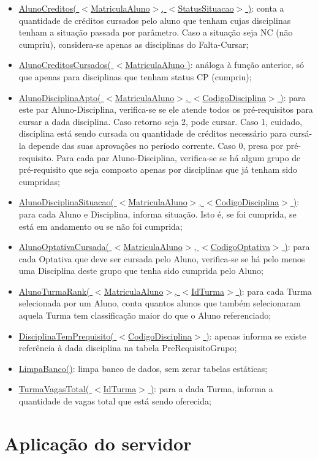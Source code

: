 \documentclass[graduacao,brazil]{ThesisPUC}
\begin{document}
\begin{itemize}
	\item \underline{AlunoCreditos( $<$MatriculaAluno$>$, $<$StatusSituacao$>$ )}: conta a quantidade de créditos cursados pelo aluno que tenham  cujas disciplinas tenham a situação passada por parâmetro. Caso a situação seja NC (não cumpriu), considera-se apenas as disciplinas do Falta-Cursar;
	\item \underline{AlunoCreditosCursados( $<$MatriculaAluno )}: análoga à função anterior, só que apenas para disciplinas que tenham status CP (cumpriu);
	\item \underline{AlunoDisciplinaApto( $<$MatriculaAluno$>$, $<$CodigoDisciplina$>$ )}: para este par Aluno-Disciplina, verifica-se se ele atende todos os pré-requisitos para cursar a dada disciplina. Caso retorno seja 2, pode cursar. Caso 1, cuidado, disciplina está sendo cursada ou quantidade de créditos necessário para cursá-la depende das suas aprovações no período corrente. Caso 0, presa por pré-requisito. Para cada par Aluno-Disciplina, verifica-se se há algum grupo de pré-requisito que seja composto apenas por disciplinas que já tenham sido cumpridas;
	\item \underline{AlunoDisciplinaSituacao( $<$MatriculaAluno$>$, $<$CodigoDisciplina$>$ )}: para cada Aluno e Disciplina, informa situação. Isto é, se foi cumprida, se está em andamento ou se não foi cumprida;
	\item \underline{AlunoOptativaCursada( $<$MatriculaAluno$>$, $<$CodigoOptativa$>$ )}: para cada Optativa que deve ser cursada pelo Aluno, verifica-se se há pelo menos uma Disciplina deste grupo que tenha sido cumprida pelo Aluno;
	\item \underline{AlunoTurmaRank( $<$MatriculaAluno$>$, $<$IdTurma$>$ )}: para cada Turma selecionada por um Aluno, conta quantos alunos que também selecionaram aquela Turma tem classificação maior do que o Aluno referenciado;
	\item \underline{DisciplinaTemPrequisito( $<$CodigoDisciplina$>$ )}: apenas informa se existe referência à dada disciplina na tabela PreRequisitoGrupo;
	\item \underline{LimpaBanco()}: limpa banco de dados, sem zerar tabelas estáticas;
	\item \underline{TurmaVagasTotal( $<$IdTurma$>$ )}: para a dada Turma, informa a quantidade de vagas total que está sendo oferecida;
\end{itemize}


\section{Aplicação do servidor}
\end{document}
